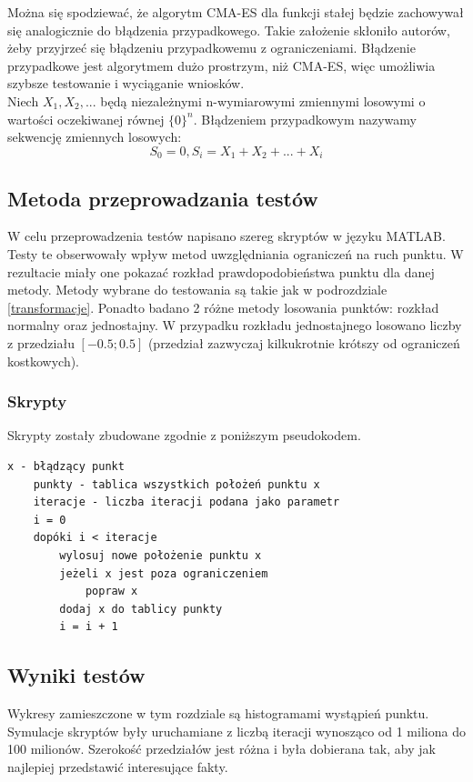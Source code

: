 \documentclass{mini}
\begin{document}
Można się spodziewać, że algorytm CMA-ES dla funkcji stałej będzie zachowywał się analogicznie do błądzenia przypadkowego. Takie założenie skłoniło autorów, żeby przyjrzeć się błądzeniu przypadkowemu z ograniczeniami. Błądzenie przypadkowe jest algorytmem dużo prostrzym, niż CMA-ES, więc umożliwia szybsze testowanie i wyciąganie wniosków.\\
Niech $ X_1, X_2, ... $ będą niezależnymi n-wymiarowymi zmiennymi losowymi o wartości oczekiwanej równej $ \{0\}^n $. Błądzeniem przypadkowym nazywamy sekwencję zmiennych losowych:
\begin{equation}
S_0 = 0, S_i=X_1+X_2+...+X_i
\end{equation}

\subsection{Metoda przeprowadzania testów}
W celu przeprowadzenia testów napisano szereg skryptów w języku MATLAB. Testy te obserwowały wpływ metod uwzględniania ograniczeń na ruch punktu. W rezultacie miały one pokazać rozkład prawdopodobieństwa punktu dla danej metody. Metody wybrane do testowania są takie jak w podrozdziale \ref{transformacje}.
Ponadto badano 2 różne metody losowania punktów: rozkład normalny oraz jednostajny. W przypadku rozkładu jednostajnego losowano liczby z przedziału $[-0.5; 0.5]$ (przedział zazwyczaj kilkukrotnie krótszy od ograniczeń kostkowych).


\subsubsection*{Skrypty}
Skrypty zostały zbudowane zgodnie z poniższym pseudokodem.
\begin{Verbatim}[baselinestretch=1.1]
	x - błądzący punkt
	punkty - tablica wszystkich położeń punktu x
	iteracje - liczba iteracji podana jako parametr
	i = 0
	dopóki i < iteracje
		wylosuj nowe położenie punktu x
		jeżeli x jest poza ograniczeniem
			popraw x
		dodaj x do tablicy punkty
		i = i + 1
\end{Verbatim}

\subsection{Wyniki testów}
Wykresy zamieszczone w tym rozdziale są histogramami wystąpień punktu. Symulacje skryptów były uruchamiane z liczbą iteracji wynosząco od 1 miliona do 100 milionów. Szerokość przedziałów jest różna i była dobierana tak, aby jak najlepiej przedstawić interesujące fakty. 
\end{document}
